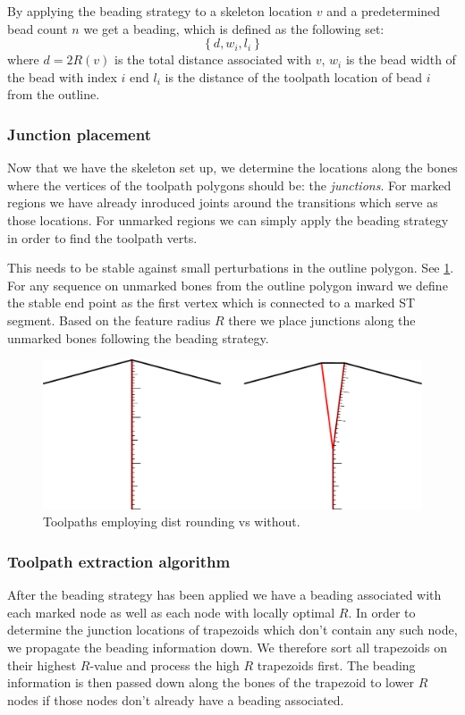 By applying the beading strategy to a skeleton location $v$ and a predetermined bead count $n$ we get a beading, which is defined as the following set:
$$
\left\{ d, w_i, l_i  \right\}
$$
where
$d = 2 R(v)$ is the total distance associated with $v$,
$w_i$ is the bead width of the bead with index $i$
end
$l_i$ is the distance of the toolpath location of bead $i$ from the outline.



\subsubsection{Junction placement}

Now that we have the skeleton set up, we determine the locations along the bones where the vertices of the toolpath polygons should be: the \emph{junctions}.
For marked regions we have already inroduced joints around the transitions which serve as those locations.
For unmarked regions we can simply apply the beading strategy in order to find the toolpath verts.


This needs to be stable against small perturbations in the outline polygon.
See \cref{heterogeneous_joint_generation}.
For any sequence on unmarked bones from the outline polygon inward we define the stable end point as the first vertex which is connected to a marked ST segment.
Based on the feature radius $R$ there we place junctions along the unmarked bones following the beading strategy.

\begin{figure}
\includegraphics[width=\columnwidth]{sources/method/heterogeneous_joint_generation.pdf}
\caption{Toolpaths employing dist rounding vs without.}
\label{heterogeneous_joint_generation}
\end{figure}





\subsubsection{Toolpath extraction algorithm}
After the beading strategy has been applied we have a beading associated with each marked node as well as each node with locally optimal $R$.
In order to determine the junction locations of trapezoids which don't contain any such node, we propagate the beading information down.
We therefore sort all trapezoids on their highest $R$-value and process the high $R$ trapezoids first.
The beading information is then passed down along the bones of the trapezoid to lower $R$ nodes if those nodes don't already have a beading associated.

